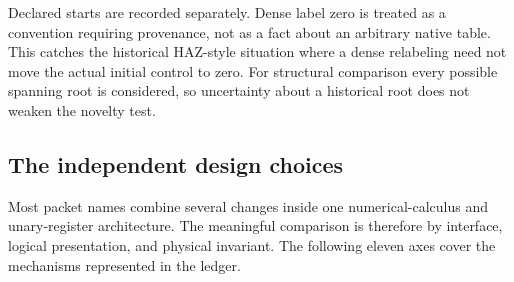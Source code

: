 \documentclass[10pt,a4paper]{article}
\theoremstyle{definition}
\begin{document}
Declared starts are recorded separately. Dense label zero is treated as
a convention requiring provenance, not as a fact about an arbitrary
native table. This catches the historical HAZ-style situation where a
dense relabeling need not move the actual initial control to zero.
For structural comparison every possible spanning root is considered,
so uncertainty about a historical root does not weaken the novelty test.

\subsection{The independent design choices}

Most packet names combine several changes inside one numerical-calculus
and unary-register architecture. The meaningful comparison is therefore
by interface, logical presentation, and physical invariant. The following
eleven axes cover the mechanisms represented in the ledger.
\end{document}
